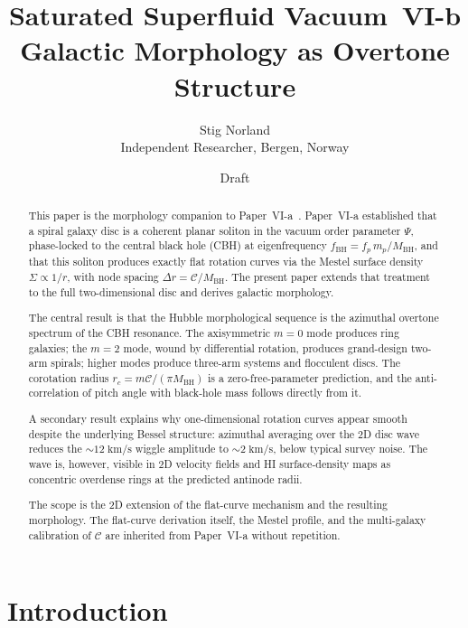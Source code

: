 \documentclass[11pt,a4paper]{article}
\title{\textbf{Saturated Superfluid Vacuum~VI-b}\\[0.4em]
\large Galactic Morphology as Overtone Structure}
\author{Stig Norland\\
\small Independent Researcher, Bergen, Norway}
\date{Draft}
\begin{document}
\maketitle

\begin{abstract}
This paper is the morphology companion to Paper~VI-a~\cite{SSV-VIa}.  Paper~VI-a
established that a spiral galaxy disc is a coherent planar soliton in the vacuum order
parameter $\Psi$, phase-locked to the central black hole (CBH) at eigenfrequency
$f_\mathrm{BH} = f_p\,m_p/M_\mathrm{BH}$, and that this soliton produces exactly flat
rotation curves via the Mestel surface density $\Sigma \propto 1/r$, with node spacing
$\Delta r = \mathcal{C}/M_\mathrm{BH}$.  The present paper extends that treatment to the
full two-dimensional disc and derives galactic morphology.

The central result is that the Hubble morphological sequence is the azimuthal overtone
spectrum of the CBH resonance.  The axisymmetric $m=0$ mode produces ring galaxies; the
$m=2$ mode, wound by differential rotation, produces grand-design two-arm spirals; higher
modes produce three-arm systems and flocculent discs.  The corotation radius
$r_c = m\mathcal{C}/(\pi M_\mathrm{BH})$ is a zero-free-parameter prediction, and the
anti-correlation of pitch angle with black-hole mass follows directly from it.

A secondary result explains why one-dimensional rotation curves appear smooth despite the
underlying Bessel structure: azimuthal averaging over the 2D disc wave reduces the
$\sim12\;\mathrm{km/s}$ wiggle amplitude to $\sim2\;\mathrm{km/s}$, below typical survey
noise.  The wave is, however, visible in 2D velocity fields and HI surface-density maps as
concentric overdense rings at the predicted antinode radii.

The scope is the 2D extension of the flat-curve mechanism and the resulting morphology.
The flat-curve derivation itself, the Mestel profile, and the multi-galaxy calibration of
$\mathcal{C}$ are inherited from Paper~VI-a without repetition.
\end{abstract}

\newpage
\tableofcontents
\newpage

\section{Introduction}
\label{sec:intro}
\end{document}
